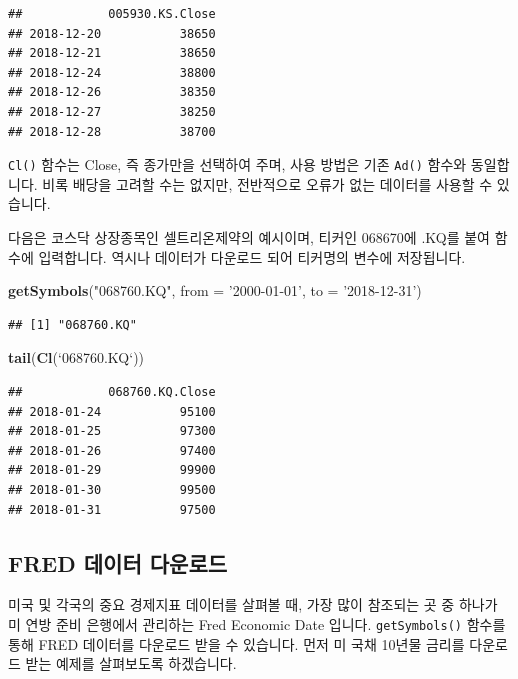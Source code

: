 \documentclass[]{book}
\newenvironment{Shaded}{\begin{snugshade}}{\end{snugshade}}
\newcommand{\DataTypeTok}[1]{\textcolor[rgb]{0.13,0.29,0.53}{#1}}
\newcommand{\KeywordTok}[1]{\textcolor[rgb]{0.13,0.29,0.53}{\textbf{#1}}}
\newcommand{\NormalTok}[1]{#1}
\newcommand{\StringTok}[1]{\textcolor[rgb]{0.31,0.60,0.02}{#1}}
\begin{document}
\begin{verbatim}
##            005930.KS.Close
## 2018-12-20           38650
## 2018-12-21           38650
## 2018-12-24           38800
## 2018-12-26           38350
## 2018-12-27           38250
## 2018-12-28           38700
\end{verbatim}

\texttt{Cl()} 함수는 Close, 즉 종가만을 선택하여 주며, 사용 방법은 기존 \texttt{Ad()} 함수와 동일합니다. 비록 배당을 고려할 수는 없지만, 전반적으로 오류가 없는 데이터를 사용할 수 있습니다.

다음은 코스닥 상장종목인 셀트리온제약의 예시이며, 티커인 068670에 .KQ를 붙여 함수에 입력합니다. 역시나 데이터가 다운로드 되어 티커명의 변수에 저장됩니다.

\begin{Shaded}
\begin{Highlighting}[]
\KeywordTok{getSymbols}\NormalTok{(}\StringTok{"068760.KQ"}\NormalTok{, }\DataTypeTok{from =} \StringTok{'2000-01-01'}\NormalTok{, }\DataTypeTok{to =} \StringTok{'2018-12-31'}\NormalTok{)}
\end{Highlighting}
\end{Shaded}

\begin{verbatim}
## [1] "068760.KQ"
\end{verbatim}

\begin{Shaded}
\begin{Highlighting}[]
\KeywordTok{tail}\NormalTok{(}\KeywordTok{Cl}\NormalTok{(}\StringTok{`}\DataTypeTok{068760.KQ}\StringTok{`}\NormalTok{))}
\end{Highlighting}
\end{Shaded}

\begin{verbatim}
##            068760.KQ.Close
## 2018-01-24           95100
## 2018-01-25           97300
## 2018-01-26           97400
## 2018-01-29           99900
## 2018-01-30           99500
## 2018-01-31           97500
\end{verbatim}

\hypertarget{fred--}{%
\subsection{FRED 데이터 다운로드}\label{fred--}}

미국 및 각국의 중요 경제지표 데이터를 살펴볼 때, 가장 많이 참조되는 곳 중 하나가 미 연방 준비 은행에서 관리하는 Fred Economic Date 입니다. \texttt{getSymbols()} 함수를 통해 FRED 데이터를 다운로드 받을 수 있습니다. 먼저 미 국채 10년물 금리를 다운로드 받는 예제를 살펴보도록 하겠습니다.
\end{document}
